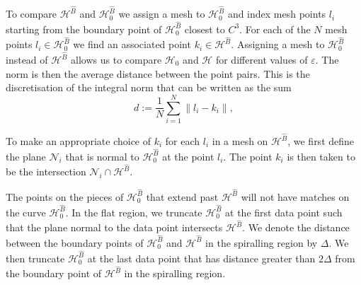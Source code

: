 \documentclass{ws-ijbc}
\begin{document}
To compare $\mathscr{H}^{\widehat{B}}$ and $\mathscr{H}_0^{\widehat{B}}$ we assign a mesh to $\mathscr{H}_0^{\widehat{B}}$ and index mesh points $l_i$ starting from the boundary point of $\mathscr{H}_0^{\widehat{B}}$ closest to $C^3$.  For each of the $N$ mesh points $l_i \in \mathscr{H}_0^{\widehat{B}}$ we find an associated point $k_i \in \mathscr{H}^{\widehat{B}}$. Assigning a mesh to $\mathscr{H}_0^{\widehat{B}}$ instead of $\mathscr{H}^{\widehat{B}}$ allows us to compare $\mathscr{H}_0$ and $\mathscr{H}$  for different values of $\varepsilon$.  The norm is then the average distance between the point pairs.  This is the discretisation of the integral norm that can be written as the sum
	\begin{equation}
		d := \frac{1}{N} \sum_{i=1}^{N} \left \lVert l_i - k_i\right \lVert,
		\label{integral_norm}
	\end{equation}

To make an appropriate choice of $k_i$ for each $l_i$ in a mesh on $\mathscr{H}^{\widehat{B}}$, we first define the plane $\mathscr{N}_i$ that is normal to $\mathscr{H}_0^{\widehat{B}}$ at the point $l_i$.  The point $k_i$ is then taken to be the intersection $\mathscr{N}_i \cap \mathscr{H}^{\widehat{B}}$.

The points on the pieces of $\mathscr{H}_0^{\widehat{B}}$ that extend past $\mathscr{H}^{\widehat{B}}$ will not have matches on the curve $\mathscr{H}_0^{\widehat{B}}$.  In the flat region, we truncate $\mathscr{H}_0^{\widehat{B}}$ at the first data point such that the plane normal to the data point intersects $\mathscr{H}^{\widehat{B}}$.  We denote the distance between the boundary points of $\mathscr{H}_0^{\widehat{B}}$ and $\mathscr{H}^{\widehat{B}}$ in the spiralling region by $\Delta$.  We then truncate $\mathscr{H}_0^{\widehat{B}}$ at the last data point that has distance greater than $2\Delta$ from the boundary point of $\mathscr{H}^{\widehat{B}}$ in the spiralling region.
\end{document}
